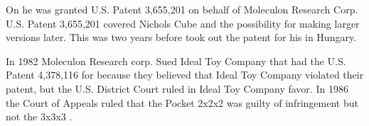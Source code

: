 On  he was granted U.S. Patent 3,655,201 on behalf of Moleculon Research Corp. U.S. Patent 3,655,201 covered Nichols Cube and the possibility for making larger versions later. This was two years before \erno{} took out the patent for his \rubik{} in Hungary. 

In 1982 Moleculon Research corp.  Sued Ideal Toy Company that had the U.S. Patent 4,378,116 for \rubik{} because they believed that Ideal Toy Company violated their patent, but the U.S. District Court ruled in Ideal Toy Company favor. In 1986 the Court of Appeals ruled that the Pocket \rubik{} 2x2x2 was guilty of infringement but not the 3x3x3 \rubik{}.

%